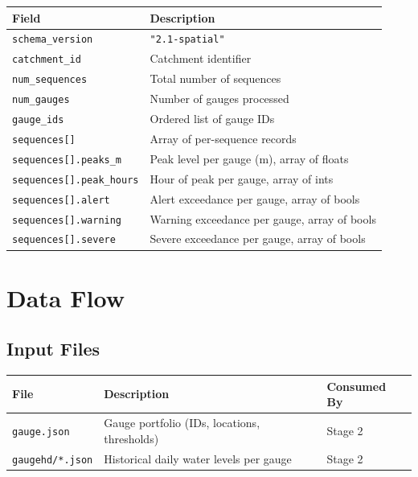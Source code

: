 \documentclass[11pt,a4paper]{article}
\begin{document}
\begin{center}
\begin{tabular}{lp{8cm}}
\toprule
\textbf{Field} & \textbf{Description} \\
\midrule
\texttt{schema\_version} & \texttt{"2.1-spatial"} \\
\texttt{catchment\_id} & Catchment identifier \\
\texttt{num\_sequences} & Total number of sequences \\
\texttt{num\_gauges} & Number of gauges processed \\
\texttt{gauge\_ids} & Ordered list of gauge IDs \\
\texttt{sequences[]} & Array of per-sequence records \\
\texttt{sequences[].peaks\_m} & Peak level per gauge (m), array of floats \\
\texttt{sequences[].peak\_hours} & Hour of peak per gauge, array of ints \\
\texttt{sequences[].alert} & Alert exceedance per gauge, array of bools \\
\texttt{sequences[].warning} & Warning exceedance per gauge, array of bools \\
\texttt{sequences[].severe} & Severe exceedance per gauge, array of bools \\
\bottomrule
\end{tabular}
\end{center}

\section{Data Flow}

\subsection{Input Files}

\begin{center}
\begin{tabular}{lp{5cm}l}
\toprule
\textbf{File} & \textbf{Description} & \textbf{Consumed By} \\
\midrule
\texttt{gauge.json} & Gauge portfolio (IDs, locations, thresholds) & Stage 2 \\
\texttt{gaugehd/*.json} & Historical daily water levels per gauge & Stage 2 \\
\bottomrule
\end{tabular}
\end{center}
\end{document}

